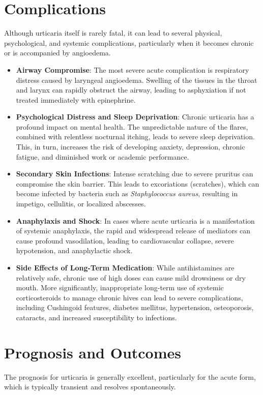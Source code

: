 \section*{Complications}
Although urticaria itself is rarely fatal, it can lead to several physical, psychological, and systemic complications, particularly when it becomes chronic or is accompanied by angioedema.

\begin{itemize}
    \item \textbf{Airway Compromise}: The most severe acute complication is respiratory distress caused by laryngeal angioedema. Swelling of the tissues in the throat and larynx can rapidly obstruct the airway, leading to asphyxiation if not treated immediately with epinephrine.
    \item \textbf{Psychological Distress and Sleep Deprivation}: Chronic urticaria has a profound impact on mental health. The unpredictable nature of the flares, combined with relentless nocturnal itching, leads to severe sleep deprivation. This, in turn, increases the risk of developing anxiety, depression, chronic fatigue, and diminished work or academic performance.
    \item \textbf{Secondary Skin Infections}: Intense scratching due to severe pruritus can compromise the skin barrier. This leads to excoriations (scratches), which can become infected by bacteria such as \textit{Staphylococcus aureus}, resulting in impetigo, cellulitis, or localized abscesses.
    \item \textbf{Anaphylaxis and Shock}: In cases where acute urticaria is a manifestation of systemic anaphylaxis, the rapid and widespread release of mediators can cause profound vasodilation, leading to cardiovascular collapse, severe hypotension, and anaphylactic shock.
    \item \textbf{Side Effects of Long-Term Medication}: While antihistamines are relatively safe, chronic use of high doses can cause mild drowsiness or dry mouth. More significantly, inappropriate long-term use of systemic corticosteroids to manage chronic hives can lead to severe complications, including Cushingoid features, diabetes mellitus, hypertension, osteoporosis, cataracts, and increased susceptibility to infections.
\end{itemize}

\section*{Prognosis and Outcomes}
The prognosis for urticaria is generally excellent, particularly for the acute form, which is typically transient and resolves spontaneously.

